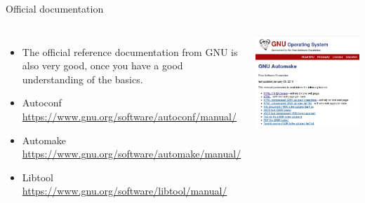 \begin{frame}{Official documentation}
  \begin{columns}
    \begin{itemize}
    \item The official reference documentation from GNU is also very
      good, once you have a good understanding of the basics.
    \item Autoconf\\
      {\small \url{https://www.gnu.org/software/autoconf/manual/}}
    \item Automake\\
      {\small \url{https://www.gnu.org/software/automake/manual/}}
    \item Libtool\\
      {\small \url{https://www.gnu.org/software/libtool/manual/}}
    \end{itemize}
    \includegraphics[width=\textwidth]{slides/autotools-references/automake-manual.png}
  \end{columns}
\end{frame}

